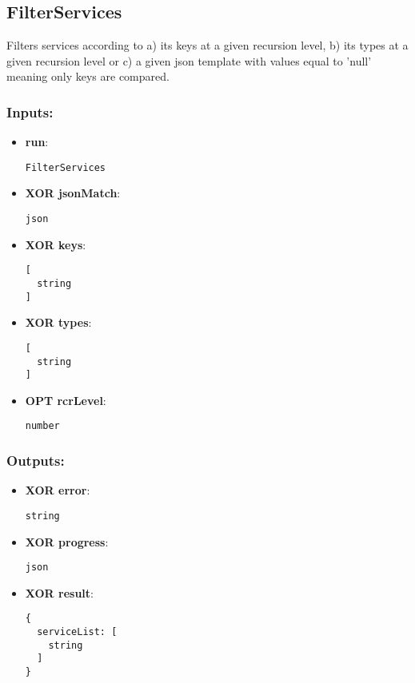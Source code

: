 \subsection{FilterServices}
\label{ch:builtinservices:FilterServices}
Filters
 services according to a) its keys at a given recursion level, b) its 
types at a given recursion level or c) a given json template with values
 equal to 'null' meaning only keys are compared.
\subsubsection*{Inputs:}
\begin{itemize}
  \small
    \item \textbf{run}: 
\begin{lstlisting}
FilterServices
\end{lstlisting}
    \item \textbf{XOR jsonMatch}: 
\begin{lstlisting}
json
\end{lstlisting}
    \item \textbf{XOR keys}: 
\begin{lstlisting}
[
  string
]
\end{lstlisting}
    \item \textbf{XOR types}: 
\begin{lstlisting}
[
  string
]
\end{lstlisting}
    \item \textbf{OPT rcrLevel}: 
\begin{lstlisting}
number
\end{lstlisting}
  \end{itemize}
\subsubsection*{Outputs:}
\begin{itemize}
  \small
    \item \textbf{XOR error}: 
\begin{lstlisting}
string
\end{lstlisting}
    \item \textbf{XOR progress}: 
\begin{lstlisting}
json
\end{lstlisting}
    \item \textbf{XOR result}: 
\begin{lstlisting}
{
  serviceList: [
    string
  ]
}
\end{lstlisting}
  \end{itemize}

